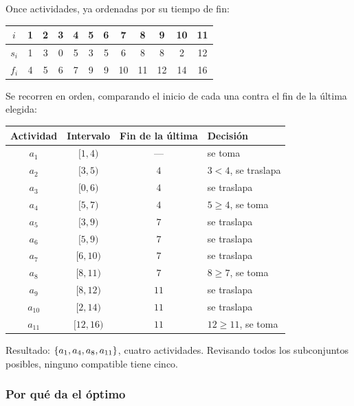 \documentclass[11pt,letterpaper]{article}
\begin{document}
\begin{ejemplo}
  Once actividades, ya ordenadas por su tiempo de fin:
  \begin{center}
  \begin{tabular}{c*{11}{c}}
    \toprule
    $i$   & 1 & 2 & 3 & 4 & 5 & 6 & 7 & 8 & 9 & 10 & 11 \\
    \midrule
    $s_i$ & 1 & 3 & 0 & 5 & 3 & 5 & 6 & 8 & 8 & 2 & 12 \\
    $f_i$ & 4 & 5 & 6 & 7 & 9 & 9 & 10 & 11 & 12 & 14 & 16 \\
    \bottomrule
  \end{tabular}
  \end{center}
  Se recorren en orden, comparando el inicio de cada una contra el fin
  de la última elegida:
  \begin{center}
  \begin{tabular}{cccl}
    \toprule
    \textbf{Actividad} & \textbf{Intervalo} & \textbf{Fin de la última}
      & \textbf{Decisión} \\
    \midrule
    $a_1$    & $[1, 4)$   & ---  & se toma \\
    $a_2$    & $[3, 5)$   & $4$  & $3 < 4$, se traslapa \\
    $a_3$    & $[0, 6)$   & $4$  & se traslapa \\
    $a_4$    & $[5, 7)$   & $4$  & $5 \geq 4$, se toma \\
    $a_5$    & $[3, 9)$   & $7$  & se traslapa \\
    $a_6$    & $[5, 9)$   & $7$  & se traslapa \\
    $a_7$    & $[6, 10)$  & $7$  & se traslapa \\
    $a_8$    & $[8, 11)$  & $7$  & $8 \geq 7$, se toma \\
    $a_9$    & $[8, 12)$  & $11$ & se traslapa \\
    $a_{10}$ & $[2, 14)$  & $11$ & se traslapa \\
    $a_{11}$ & $[12, 16)$ & $11$ & $12 \geq 11$, se toma \\
    \bottomrule
  \end{tabular}
  \end{center}
  Resultado: $\left\{ a_1, a_4, a_8, a_{11} \right\}$, cuatro actividades.
  Revisando todos los subconjuntos posibles, ninguno compatible tiene
  cinco.
\end{ejemplo}

\subsubsection*{Por qué da el óptimo}
\end{document}
